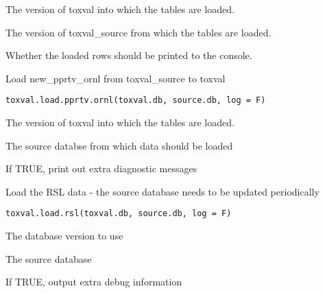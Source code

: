 \documentclass[letterpaper]{book}
\begin{document}
%
\begin{Arguments}
\begin{ldescription}
\item[\code{toxval.db}] The version of toxval into which the tables are loaded.

\item[\code{source.db}] The version of toxval\_source from which the tables are loaded.

\item[\code{verbose}] Whether the loaded rows should be printed to the console.
\end{ldescription}
\end{Arguments}
%
\begin{Description}\relax
Load new\_pprtv\_ornl from toxval\_source to toxval
\end{Description}
%
\begin{Usage}
\begin{verbatim}
toxval.load.pprtv.ornl(toxval.db, source.db, log = F)
\end{verbatim}
\end{Usage}
%
\begin{Arguments}
\begin{ldescription}
\item[\code{toxval.db}] The version of toxval into which the tables are loaded.

\item[\code{source.db}] The source databse from which data should be loaded

\item[\code{verbose}] If TRUE, print out extra diagnostic messages
\end{ldescription}
\end{Arguments}
%
\begin{Description}\relax
Load the RSL data - the source database needs to be updated periodically
\end{Description}
%
\begin{Usage}
\begin{verbatim}
toxval.load.rsl(toxval.db, source.db, log = F)
\end{verbatim}
\end{Usage}
%
\begin{Arguments}
\begin{ldescription}
\item[\code{toxval.db}] The database version to use

\item[\code{source.db}] The source database

\item[\code{verbose}] If TRUE, output extra debug information
\end{ldescription}
\end{Arguments}
\end{document}
